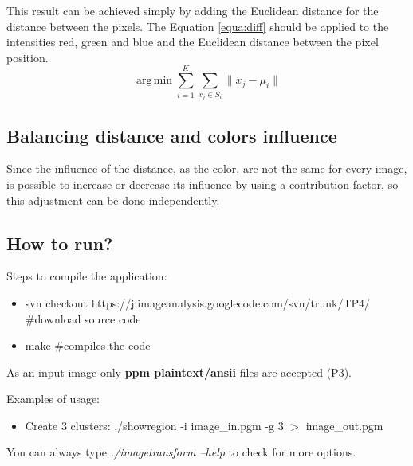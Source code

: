 \documentclass{article}
\begin{document}
This result can be achieved simply by adding the Euclidean distance for the distance between the pixels. The Equation \ref{equa:diff} should be applied to the intensities red, green and blue and the Euclidean distance between the pixel position.
\begin{equation}
 \operatorname{arg\,min}\sum_{i=1}^{K}\sum_{x_j \in S_i}^{} \|x_j-\mu_i\|
\label{equa:diff}
\end{equation}

\subsection{Balancing distance and colors influence}

Since the influence of the distance, as the color, are not the same for every image, is possible to increase or decrease its influence by using a contribution factor, so this adjustment can be done independently.

	\subsection{How to run?}

	Steps to compile the application:
	
	\begin{itemize}
		\item svn checkout https://jfimageanalysis.googlecode.com/svn/trunk/TP4/ \#download source code
		\item make \#compiles the code
	\end{itemize}

	As an input image only {\bf ppm plaintext/ansii} files are accepted (P3). 

	Examples of usage:

	\begin{itemize}
		\item Create 3 clusters:
		\subitem ./showregion -i image\_in.pgm -g 3 $>$ image\_out.pgm
	\end{itemize}

	You can always type {\it ./imagetransform --help} to check for more options. 
\end{document}
